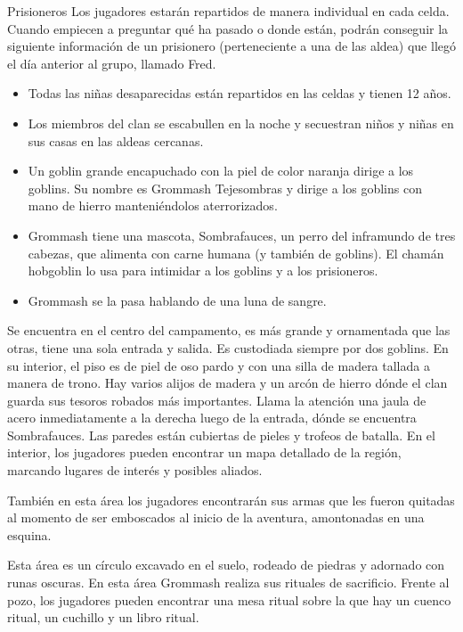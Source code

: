 \documentclass[10pt,twoside,twocolumn,openany]{dndbook}
\begin{document}
\begin{DndComment}{Prisioneros}
Los jugadores estarán repartidos de manera individual en cada celda. Cuando empiecen a preguntar qué 
ha pasado o donde están, podrán conseguir la siguiente información de un prisionero (perteneciente 
a una de las aldea) que llegó el día anterior al grupo, llamado Fred.

\begin{itemize}
    \item Todas las niñas desaparecidas están repartidos en las celdas y tienen 12 años.
    \item Los miembros del clan se escabullen en la noche y secuestran niños y niñas en sus casas en las aldeas cercanas.
    \item Un goblin grande encapuchado con la piel de color naranja dirige a los goblins. Su nombre es Grommash Tejesombras y dirige a los goblins con mano de hierro manteniéndolos aterrorizados.
    \item Grommash tiene una mascota, Sombrafauces, un perro del inframundo de tres cabezas, que alimenta con carne humana (y también de goblins). El chamán hobgoblin lo usa para intimidar a los goblins y a los prisioneros.
    \item Grommash se la pasa hablando de una luna de sangre.
\end{itemize}

\end{DndComment}

Se encuentra en el centro del campamento, es más grande y ornamentada que las otras, tiene una sola 
entrada y salida. Es custodiada siempre por dos goblins. En su interior, el piso es de piel de oso pardo 
y con una silla de madera tallada a manera de trono. Hay varios alijos de madera y un arcón de hierro 
dónde el clan guarda sus tesoros robados más importantes. Llama la atención una jaula de acero 
inmediatamente a la derecha luego de la entrada, dónde se encuentra Sombrafauces. Las paredes están 
cubiertas de pieles y trofeos de batalla. En el interior, los jugadores pueden encontrar un mapa 
detallado de la región, marcando lugares de interés y posibles aliados.

También en esta área los jugadores encontrarán sus armas que les fueron quitadas al momento de ser
emboscados al inicio de la aventura, amontonadas en una esquina.

Esta área es un círculo excavado en el suelo, rodeado de piedras y adornado con runas oscuras. En esta 
área Grommash realiza sus rituales de sacrificio. Frente al pozo, los jugadores pueden encontrar 
una mesa ritual sobre la que hay un cuenco ritual, un cuchillo y un libro ritual.
\end{document}
